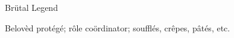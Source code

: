 Br\"utal Legend

Belov\`ed prot\'eg\'e; r\^ole co\"ordinator; souffl\'es, cr\^epes,
p\^at\'es, etc.
